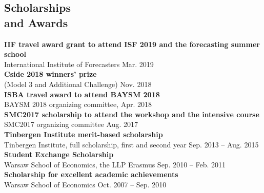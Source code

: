 \documentclass[margin,line]{resume}
\begin{document}
\begin{resume}


 


   \section{\mysidestyle Scholarships \\and Awards}	
   	\textbf{IIF travel award grant to attend ISF 2019 and the forecasting summer school} \\
   	International Institute of Forecasters%
   	\hfill Mar. 2019 \vspace{1.5mm} \\ 
   	\textbf{Cside 2018 winners' prize} \\
   	(Model 3 and Additional Challenge)%
   	 \hfill Nov. 2018 \vspace{1.5mm} \\ 
   	\textbf{ISBA travel award to attend BAYSM 2018}\\ BAYSM 2018 organizing committee,%
   	\hfill Apr. 2018 \vspace{1.5mm} \\ 
   	\textbf{SMC2017 scholarship to attend the workshop and the intensive course}\\ SMC2017 organizing committee %
   	\hfill Aug. 2017 \vspace{1.5mm} \\   
   	\textbf{Tinbergen Institute merit-based scholarship}\\ Tinbergen Institute, full scholarship, first and second year%
   	\hfill Sep. 2013 -- Aug. 2015\vspace{1.5mm} \\   
       \textbf{Student Exchange Scholarship}\\  Warsaw School of Economics, the LLP Erasmus \hfill Sep. 2010 -- Feb. 2011\vspace{1.5mm} \\
       \textbf{Scholarship for excellent academic achievements}\\ Warsaw School of Economics \hfill Oct. 2007 -- Sep. 2010 


\end{resume}
\end{document}
